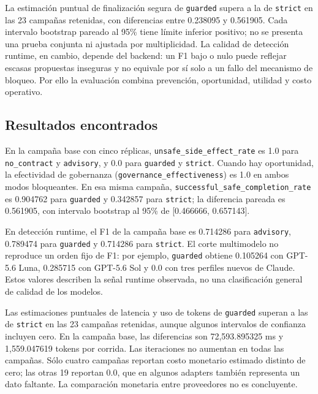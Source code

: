 La estimaci\'on puntual de finalizaci\'on segura de \texttt{guarded} supera a la de \texttt{strict} en las 23 campa\~nas retenidas, con diferencias entre 0.238095 y 0.561905. Cada intervalo bootstrap pareado al 95\% tiene l\'imite inferior positivo; no se presenta una prueba conjunta ni ajustada por multiplicidad. La calidad de detecci\'on runtime, en cambio, depende del backend: un F1 bajo o nulo puede reflejar escasas propuestas inseguras y no equivale por s\'i solo a un fallo del mecanismo de bloqueo. Por ello la evaluaci\'on combina prevenci\'on, oportunidad, utilidad y costo operativo.

\subsection{Resultados encontrados}
En la campa\~na base con cinco r\'eplicas, \texttt{unsafe\_side\_effect\_rate} es 1.0 para \texttt{no\_contract} y \texttt{advisory}, y 0.0 para \texttt{guarded} y \texttt{strict}. Cuando hay oportunidad, la efectividad de gobernanza (\texttt{governance\_effectiveness}) es 1.0 en ambos modos bloqueantes. En esa misma campa\~na, \texttt{successful\_safe\_completion\_rate} es 0.904762 para \texttt{guarded} y 0.342857 para \texttt{strict}; la diferencia pareada es 0.561905, con intervalo bootstrap al 95\% de [0.466666, 0.657143].

En detecci\'on runtime, el F1 de la campa\~na base es 0.714286 para \texttt{advisory}, 0.789474 para \texttt{guarded} y 0.714286 para \texttt{strict}. El corte multimodelo no reproduce un orden fijo de F1: por ejemplo, \texttt{guarded} obtiene 0.105264 con GPT-5.6 Luna, 0.285715 con GPT-5.6 Sol y 0.0 con tres perfiles nuevos de Claude. Estos valores describen la se\~nal runtime observada, no una clasificaci\'on general de calidad de los modelos.

Las estimaciones puntuales de latencia y uso de tokens de \texttt{guarded} superan a las de \texttt{strict} en las 23 campa\~nas retenidas, aunque algunos intervalos de confianza incluyen cero. En la campa\~na base, las diferencias son 72,593.895325 ms y 1,559.047619 tokens por corrida. Las iteraciones no aumentan en todas las campa\~nas. S\'olo cuatro campa\~nas reportan costo monetario estimado distinto de cero; las otras 19 reportan 0.0, que en algunos adapters tambi\'en representa un dato faltante. La comparaci\'on monetaria entre proveedores no es concluyente.

